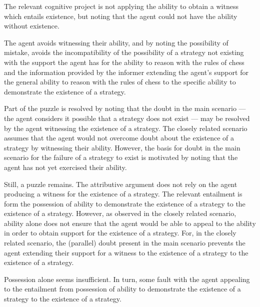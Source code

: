 \documentclass[10pt]{article}
\begin{document}
\begin{note}
  The relevant cognitive project is not applying the ability to obtain a witness which entails existence, but noting that the agent could not have the ability without existence.

  The agent avoids witnessing their ability, and by noting the possibility of mistake, avoids the incompatibility of the possibility of a strategy not existing with the support the agent has for the ability to reason with the rules of chess and the information provided by the informer extending the agent's support for the general ability to reason with the rules of chess to the specific ability to demonstrate the existence of a strategy.

  Part of the puzzle is resolved by noting that the doubt in the main scenario --- the agent considers it possible that a strategy does not exist --- may be resolved by the agent witnessing the existence of a strategy.
  The closely related scenario assumes that the agent would not overcome doubt about the existence of a strategy by witnessing their ability.
  However, the basis for doubt in the main scenario for the failure of a strategy to exist is motivated by noting that the agent has not yet exercised their ability.

  Still, a puzzle remains.
  The attributive argument does not rely on the agent producing a witness for the existence of a strategy.
  The relevant entailment is form the possession of ability to demonstrate the existence of a strategy to the existence of a strategy.
  However, as observed in the closely related scenario, ability alone does not ensure that the agent would be able to appeal to the ability in order to obtain support for the existence of a strategy.
  For, in the closely related scenario, the (parallel) doubt present in the main scenario prevents the agent extending their support for a witness to the existence of a strategy to the existence of a strategy.

  Possession alone seems insufficient.
  In turn, some fault with the agent appealing to the entailment from possession of ability to demonstrate the existence of a strategy to the existence of a strategy.
\end{note}
\end{document}
